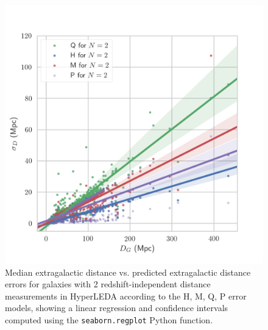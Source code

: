 \documentclass[a4paper,fleqn,usenatbib]{mnras}
\begin{document}
\begin{figure}
	\includegraphics[scale=0.7]{HLlow.png}
    \caption{Median extragalactic distance vs. predicted extragalactic distance errors for galaxies with 2 redshift-independent distance measurements in HyperLEDA according to the H, M, Q, P error models, showing a linear regression and confidence intervals computed using the \texttt{seaborn.regplot} Python function.}
    \label{fig:HLlow}
\end{figure}
\end{document}
